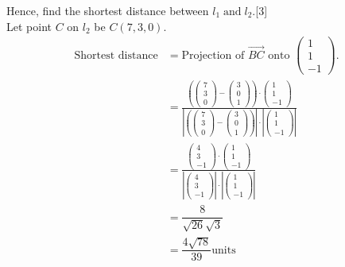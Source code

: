 \documentclass[12pt, a4 paper]{article}
\begin{document}
\begin{outline}[enumerate]
					\color{black}
					\2 Hence, find the shortest distance between ${l_1}\;{\textrm{and}}\;{l_2}$.\hfill[3]
					\color{blue}
					\\{\textrm{Let point }}$C${\textrm{ on }}${l_2}${\textrm{ be }}$C(7,3,0)$.
					\begin{align*}
						\textrm{Shortest distance} & =  \textrm{Projection of }\overrightarrow {BC} {\textrm{ onto }}\left( {\begin{array}{*{20}{c}}1 \\1\\{ - 1}\end{array}} \right).\\ &= \frac{{\left( {\left( {\begin{array}{*{20}{c}}7\\3\\0\end{array}} \right) - \left( {\begin{array}{*{20}{c}}3\\0\\1\end{array}} \right)} \right) \cdot \left( {\begin{array}{*{20}{c}}1\\1\\{ - 1}\end{array}} \right)}}{{\left| {\left( {\left( {\begin{array}{*{20}{c}}7\\3\\0\end{array}} \right) - \left( {\begin{array}{*{20}{c}}3\\0\\1\end{array}} \right)} \right)} \right| \cdot \left| {\left( {\begin{array}{*{20}{c}}1\\1\\{ - 1}\end{array}} \right)} \right|}}\\ &= \frac{{\left( {\begin{array}{*{20}{c}}4\\3\\{ - 1}\end{array}} \right) \cdot \left( {\begin{array}{*{20}{c}}1\\1\\{ - 1}\end{array}} \right)}}{{\left| {\left( {\begin{array}{*{20}{c}}4\\3\\{ - 1}\end{array}} \right)} \right| \cdot \left| {\left( {\begin{array}{*{20}{c}}1\\1\\{ - 1}\end{array}} \right)} \right|}}\\ &= \dfrac{8}{{\sqrt {26} \sqrt 3 }}\\ &= \dfrac{{4\sqrt {78} }}{{39}}{\textrm{units}}

\end{align*}
\end{outline}
\end{document}

